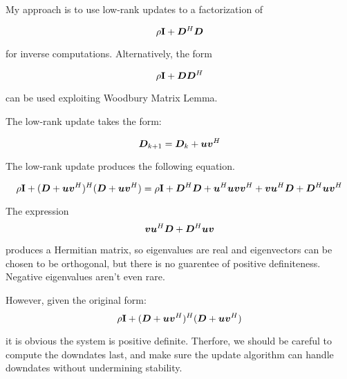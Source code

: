 \documentclass{article}
\begin{document}
My approach is to use low-rank updates to a factorization of

\begin{equation}
\rho{\bf I} + \bm{D}^H\bm{D}
\end{equation}

for inverse computations. Alternatively, the form

\begin{equation}
\rho{\bf I} + \bm{D}\bm{D}^H
\end{equation}

can be used exploiting Woodbury Matrix Lemma.

The low-rank update takes the form:

\begin{equation}
\bm{D}_{k+1} = \bm{D}_k + \bm{u}\bm{v}^H
\end{equation}

The low-rank update produces the following equation.

\begin{equation}
\rho{\bf I} + (\bm{D} + \bm{u}\bm{v}^H)^H(\bm{D} + \bm{u}\bm{v}^H) = \rho{\bf I} + \bm{D}^H\bm{D} + \bm{u}^H\bm{u} \bm{v}\bm{v}^H + \bm{v}\bm{u}^H\bm{D} + \bm{D}^H\bm{u}\bm{v}^H
\end{equation}

The expression
\begin{equation}
\bm{v}\bm{u}^H\bm{D} + \bm{D}^H\bm{u}\bm{v}
\end{equation}

produces a Hermitian matrix, so eigenvalues are real and eigenvectors can be chosen to be orthogonal, but there is no guarentee of positive definiteness. Negative eigenvalues aren't even rare.

However, given the original form:
\begin{equation}
\rho{\bf I} + (\bm{D} + \bm{u}\bm{v}^H)^H(\bm{D} + \bm{u}\bm{v}^H) 
\end{equation}

it is obvious the system is positive definite. Therfore, we should be careful to compute the downdates last, and make sure the update algorithm can handle downdates without undermining stability.
\end{document}
